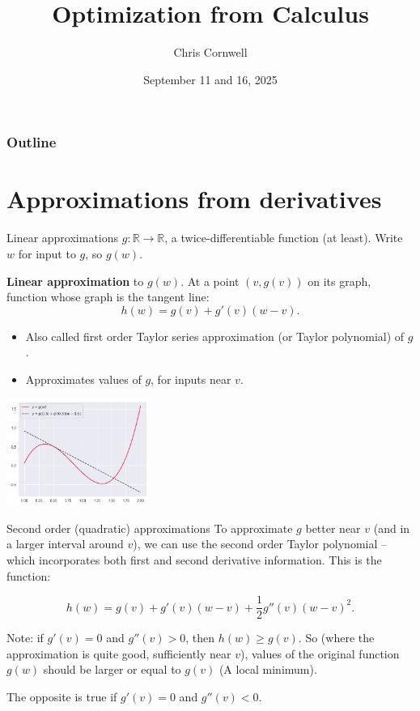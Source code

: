 \documentclass{beamer}
\author{Chris Cornwell}
\date{September 11 and 16, 2025}
\title{Optimization from Calculus}
\theoremstyle{example}
\newcommand{\bb}[1]{\mathbb{#1}}
\begin{document}
\begin{frame}
\titlepage
\end{frame}

\begin{frame}
\frametitle{Outline}
\tableofcontents
\end{frame}

\section{Approximations from derivatives}

\begin{frame}{Linear approximations}
    $g:\bb R\to\bb R$, a twice-differentiable function (at least).  Write $w$ for input to $g$, so $g(w)$.

    \textbf{Linear approximation} to $g(w)$. At a point $(v, g(v))$ on its graph, function whose graph is the tangent line:
        \[h(w) = g(v) + g'(v)(w - v).\]
    \vspace*{-12pt}
    \begin{multicols}{2}
        \begin{itemize}
            \item Also called first order Taylor series approximation (or Taylor polynomial) of $g$. 
            \item Approximates values of $g$, for inputs near $v$.
        \end{itemize}

        \includegraphics[width=0.35\textwidth]{../../Images/graph-and-linearapproximation.png}
    \end{multicols}

\end{frame}

\begin{frame}{Second order (quadratic) approximations}
    To approximate $g$ better near $v$ (and in a larger interval around $v$), we can use the second order Taylor polynomial {--} which incorporates both first and second derivative information.  This is the function:

    \[h(w) = g(v) + g'(v)(w - v) + \frac12g''(v)(w - v)^2.\]

    
    Note: if $g'(v) = 0$ and $g''(v) > 0$, then $h(w) \ge g(v)$. So (where the approximation is quite good, sufficiently near $v$), values of the original function $g(w)$ should be larger or equal to $g(v)$ (A local minimum).

    The opposite is true if $g'(v) = 0$ and $g''(v) < 0$.
\end{frame}
\end{document}
